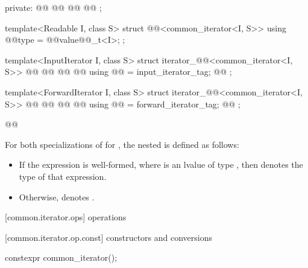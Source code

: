 \begin{addedblock}
\begin{codeblock}
{{  private:
    @@
    @@
    @@
    @@
  };

  template<Readable I, class S>
  struct @@<common_iterator<I, S>> {
    using @@type = @@value@@_t<I>;
  };

  template<InputIterator I, class S>
  struct iterator_@@<common_iterator<I, S>> {
    @@
    @@
    @@
    @@
    using @@ = input_iterator_tag;
    @@
  };

  template<ForwardIterator I, class S>
  struct iterator_@@<common_iterator<I, S>> {
    @@
    @@
    @@
    @@
    using @@ = forward_iterator_tag;
    @@
  };
}@\oldtxt{\}\}\}}@
\end{codeblock}

{\color{newclr}
\pnum
For both specializations of  for
, the nested 
 is defined as follows:
\begin{itemize}
\item If the expression  is well-formed, where 
is an lvalue of type , then
 denotes the type of that expression.
\item Otherwise,  denotes .
\end{itemize}
} %

[common.iterator.ops]{ operations}

[common.iterator.op.const]{ constructors and conversions}

{\color{oldclr}
%
\begin{itemdecl}
constexpr common_iterator();
\end{itemdecl}

}
\end{addedblock}
